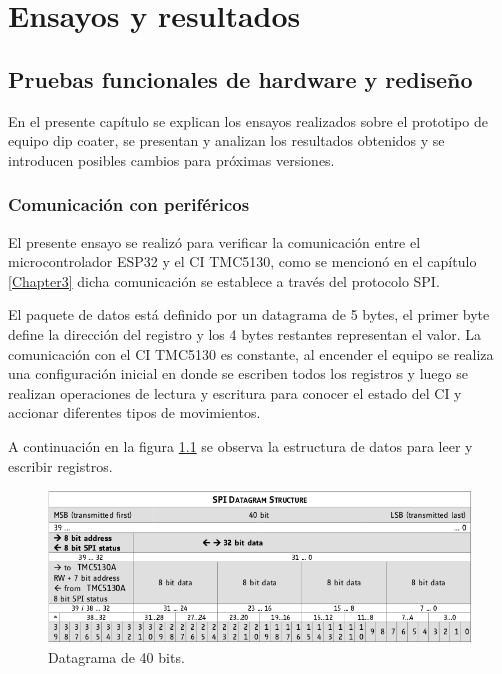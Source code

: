 
\chapter{Ensayos y resultados} %

\label{Chapter4} %


\section{Pruebas funcionales de hardware y rediseño}

En el presente capítulo se explican los ensayos realizados sobre el prototipo de equipo dip coater, se presentan y analizan los resultados obtenidos y se introducen posibles cambios para próximas versiones.
\subsection{Comunicación con periféricos}

El presente ensayo se realizó para verificar la comunicación entre el microcontrolador ESP32 y el CI TMC5130, como se mencionó en el capítulo \ref{Chapter3} dicha comunicación se establece a través del  protocolo SPI. 

El paquete de datos está definido por un datagrama de 5 bytes, el primer byte define la dirección del registro y los 4 bytes restantes representan el valor. La comunicación con el CI TMC5130  es constante, al encender el equipo se realiza una configuración inicial en donde se escriben todos los registros y luego se realizan operaciones de lectura y escritura para conocer el estado del CI y accionar diferentes tipos de movimientos.

A continuación en la figura \ref{fig:datagrama} se observa la estructura de datos para leer y escribir registros.
\begin{figure}[h]
\centering 
\includegraphics[width=1\textwidth]{./Figures/datagrama.png}
\caption{Datagrama de 40 bits.}
\label{fig:datagrama}
\end{figure}

